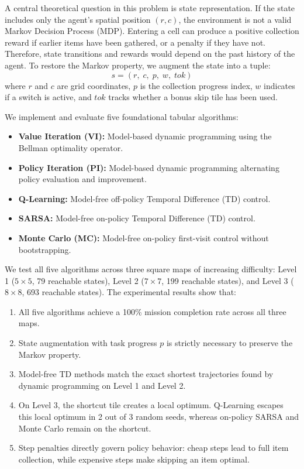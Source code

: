 \documentclass[10pt,conference]{IEEEtran}
\begin{document}
A central theoretical question in this problem is state representation. If the state includes only the agent's spatial position $(r, c)$, the environment is not a valid Markov Decision Process (MDP). Entering a cell can produce a positive collection reward if earlier items have been gathered, or a penalty if they have not. Therefore, state transitions and rewards would depend on the past history of the agent. To restore the Markov property, we augment the state into a tuple:
\begin{equation}
    s = (r,\; c,\; p,\; w,\; tok)
\end{equation}
where $r$ and $c$ are grid coordinates, $p$ is the collection progress index, $w$ indicates if a switch is active, and $tok$ tracks whether a bonus skip tile has been used.

We implement and evaluate five foundational tabular algorithms:
\begin{itemize}
    \item \textbf{Value Iteration (VI):} Model-based dynamic programming using the Bellman optimality operator.
    \item \textbf{Policy Iteration (PI):} Model-based dynamic programming alternating policy evaluation and improvement.
    \item \textbf{Q-Learning:} Model-free off-policy Temporal Difference (TD) control.
    \item \textbf{SARSA:} Model-free on-policy Temporal Difference (TD) control.
    \item \textbf{Monte Carlo (MC):} Model-free on-policy first-visit control without bootstrapping.
\end{itemize}

We test all five algorithms across three square maps of increasing difficulty: Level 1 ($5\times 5$, 79 reachable states), Level 2 ($7\times 7$, 199 reachable states), and Level 3 ($8\times 8$, 693 reachable states). The experimental results show that:
\begin{enumerate}
    \item All five algorithms achieve a 100\% mission completion rate across all three maps.
    \item State augmentation with task progress $p$ is strictly necessary to preserve the Markov property.
    \item Model-free TD methods match the exact shortest trajectories found by dynamic programming on Level 1 and Level 2.
    \item On Level 3, the shortcut tile creates a local optimum. Q-Learning escapes this local optimum in 2 out of 3 random seeds, whereas on-policy SARSA and Monte Carlo remain on the shortcut.
    \item Step penalties directly govern policy behavior: cheap steps lead to full item collection, while expensive steps make skipping an item optimal.
\end{enumerate}
\end{document}
